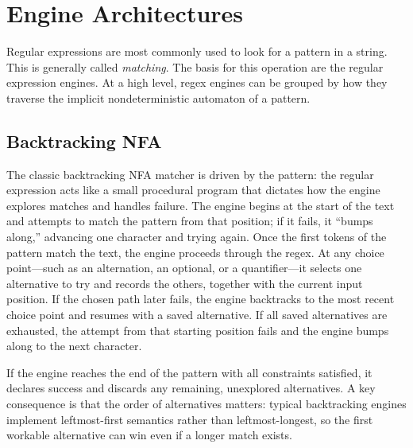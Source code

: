 \section{Engine Architectures}
Regular expressions are most commonly used to look for a pattern in a string. This is generally called \emph{matching}.
The basis for this operation are the regular expression engines.
At a high level, regex engines can be grouped by how they traverse the implicit nondeterministic automaton of a pattern.


\subsection{Backtracking NFA}
The classic backtracking NFA matcher is driven by the pattern: the regular expression acts like a small procedural program that dictates how the engine explores matches and handles failure. The engine begins at the start of the text and attempts to match the pattern from that position; if it fails, it “bumps along,” advancing one character and trying again. Once the first tokens of the pattern match the text, the engine proceeds through the regex. At any choice point—such as an alternation, an optional, or a quantifier—it selects one alternative to try and records the others, together with the current input position. If the chosen path later fails, the engine backtracks to the most recent choice point and resumes with a saved alternative. If all saved alternatives are exhausted, the attempt from that starting position fails and the engine bumps along to the next character.

If the engine reaches the end of the pattern with all constraints satisfied, it declares success and discards any remaining, unexplored alternatives. A key consequence is that the order of alternatives matters: typical backtracking engines implement leftmost-first semantics rather than leftmost-longest, so the first workable alternative can win even if a longer match exists.

